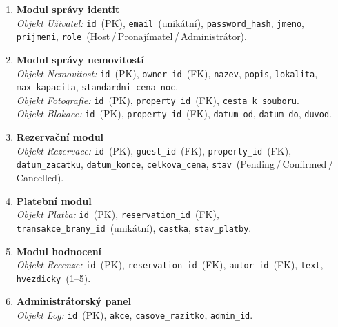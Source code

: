 \documentclass[11pt, a4paper]{article}
\begin{document}
\begin{enumerate}[leftmargin=*, label=\textbf{\arabic*.}]

  \item \textbf{\textcolor{mainblue}{Modul správy identit}}\\
    \textit{Objekt Uživatel:}
    \texttt{id}~(PK), \texttt{email}~(unikátní), \texttt{password\_hash},
    \texttt{jmeno}, \texttt{prijmeni},
    \texttt{role}~(Host\,/\,Pronajímatel\,/\,Administrátor).

  \item \textbf{\textcolor{mainblue}{Modul správy nemovitostí}}\\
    \textit{Objekt Nemovitost:}
    \texttt{id}~(PK), \texttt{owner\_id}~(FK), \texttt{nazev}, \texttt{popis},
    \texttt{lokalita}, \texttt{max\_kapacita}, \texttt{standardni\_cena\_noc}.\\
    \textit{Objekt Fotografie:}
    \texttt{id}~(PK), \texttt{property\_id}~(FK), \texttt{cesta\_k\_souboru}.\\
    \textit{Objekt Blokace:}
    \texttt{id}~(PK), \texttt{property\_id}~(FK),
    \texttt{datum\_od}, \texttt{datum\_do}, \texttt{duvod}.

  \item \textbf{\textcolor{mainblue}{Rezervační modul}}\\
    \textit{Objekt Rezervace:}
    \texttt{id}~(PK), \texttt{guest\_id}~(FK), \texttt{property\_id}~(FK),
    \texttt{datum\_zacatku}, \texttt{datum\_konce}, \texttt{celkova\_cena},
    \texttt{stav}~(Pending\,/\,Confirmed\,/\,Cancelled).

  \item \textbf{\textcolor{mainblue}{Platební modul}}\\
    \textit{Objekt Platba:}
    \texttt{id}~(PK), \texttt{reservation\_id}~(FK),
    \texttt{transakce\_brany\_id}~(unikátní), \texttt{castka},
    \texttt{stav\_platby}.

  \item \textbf{\textcolor{mainblue}{Modul hodnocení}}\\
    \textit{Objekt Recenze:}
    \texttt{id}~(PK), \texttt{reservation\_id}~(FK), \texttt{autor\_id}~(FK),
    \texttt{text}, \texttt{hvezdicky}~(1--5).

  \item \textbf{\textcolor{mainblue}{Administrátorský panel}}\\
    \textit{Objekt Log:}
    \texttt{id}~(PK), \texttt{akce}, \texttt{casove\_razitko},
    \texttt{admin\_id}.

\end{enumerate}
\end{document}
